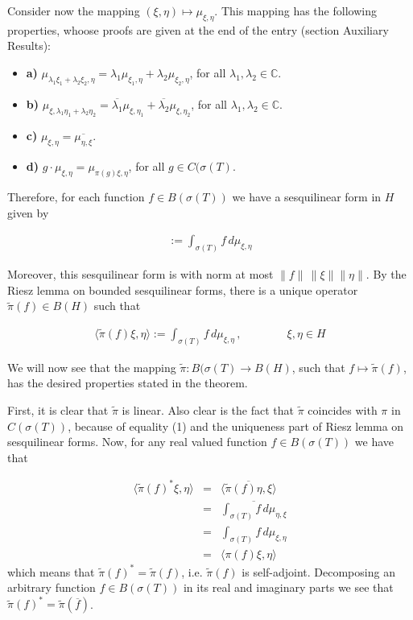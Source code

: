 \documentclass[12pt]{article}
\begin{document}
Consider now the mapping $(\xi, \eta) \mapsto \mu_{\xi, \eta}$. This mapping has the following properties, whoose proofs are given at the end of the entry (section Auxiliary Results):
\begin{itemize}
\item[] {\bf a)} $\mu_{\lambda_1\xi_1+ \lambda_2\xi_2, \eta} = \lambda_1\mu_{\xi_1,\eta} + \lambda_2\mu_{\xi_2, \eta}$, for all $\lambda_1, \lambda_2 \in \mathbb{C}$.
\item[] {\bf b)} $\mu_{\xi, \lambda_1 \eta_1+ \lambda_2 \eta_2} = \overline{\lambda_1}\mu_{\xi,\eta_1} + \overline{\lambda_2}\mu_{\xi, \eta_2}$, for all $\lambda_1, \lambda_2 \in \mathbb{C}$.
\item[] {\bf c)} $\mu_{\xi, \eta} = \overline{\mu_{\eta, \xi}}$.
\item[] {\bf d)} $g \cdot \mu_{\xi, \eta} = \mu_{\pi(g) \xi, \eta}$, for all $g \in C(\sigma(T)$.
\end{itemize}

Therefore, for each function $f \in B(\sigma(T))$ we have a sesquilinear form in $H$ given by

\begin{align*}
[\xi, \eta] := \int_{\sigma(T)} f\, d\mu_{\xi, \eta}
\end{align*}

Moreover, this sesquilinear form is  with norm at most $\|f\| \, \|\xi\| \|\eta\|$. By the Riesz lemma on bounded sesquilinear forms, there is a unique operator $\widetilde{\pi}(f) \in B(H)$ such that

\begin{align*}
\langle \widetilde{\pi}(f)\xi, \eta \rangle := \int_{\sigma(T)} f\, d\mu_{\xi, \eta}\,, \qquad\qquad \xi, \eta \in H
\end{align*}

We will now see that the mapping $\widetilde{\pi}: B(\sigma(T) \to B(H)$, such that $f \mapsto \widetilde{\pi}(f)$, has the desired properties stated in the theorem.

First, it is clear that $\widetilde{\pi}$ is linear. Also clear is the fact that $\widetilde{\pi}$ coincides with $\pi$ in $C(\sigma(T))$, because of equality (1) and the uniqueness part of Riesz lemma on sesquilinear forms. Now, for any real valued function $f \in B(\sigma(T))$ we have that

\begin{eqnarray*}
\langle \widetilde{\pi}(f)^*\xi, \eta \rangle & = & \overline{\langle \widetilde{\pi}(f) \eta , \xi \rangle} \\
& = & \overline{\int_{\sigma(T)} f\, d\mu_{\eta, \xi}}\\
& = & \int_{\sigma(T)} f\, d\mu_{\xi, \eta}\\
& = & \langle \pi(f) \xi, \eta \rangle
\end{eqnarray*}
which means that $\widetilde{\pi}(f)^* = \widetilde{\pi}(f)$, i.e. $\widetilde{\pi}(f)$ is self-adjoint. Decomposing an arbitrary function $f \in B(\sigma(T))$ in its real and imaginary parts we see that $\widetilde{\pi}(f)^*=\widetilde{\pi}(\overline{f})$.
\end{document}
